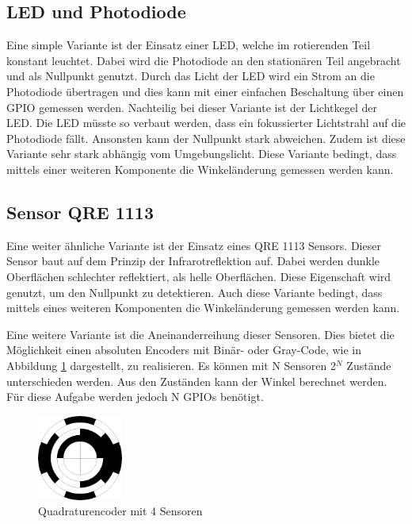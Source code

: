 \subsection{LED und Photodiode}
\label{sec:LED}
Eine simple Variante ist der Einsatz einer LED, welche im rotierenden Teil konstant leuchtet. Dabei wird die Photodiode an den stationären Teil angebracht und als Nullpunkt genutzt. Durch das Licht der LED wird ein Strom an die Photodiode übertragen und dies kann mit einer einfachen Beschaltung über einen GPIO gemessen werden. Nachteilig bei dieser Variante ist der Lichtkegel der LED. Die LED müsste so verbaut werden, dass ein fokussierter Lichtstrahl auf die Photodiode fällt. Ansonsten kann der  Nullpunkt stark abweichen. Zudem ist diese Variante sehr stark abhängig vom Umgebungslicht. Diese Variante bedingt, dass mittels einer weiteren Komponente die Winkeländerung gemessen werden kann.

\subsection{Sensor QRE 1113}
\label{sec:QRE}
Eine weiter ähnliche Variante ist der Einsatz eines QRE 1113 Sensors. Dieser Sensor baut auf dem Prinzip der Infrarotreflektion auf. Dabei werden dunkle Oberflächen schlechter reflektiert, als helle Oberflächen. Diese Eigenschaft wird genutzt, um den Nullpunkt zu detektieren. Auch diese Variante bedingt, dass mittels eines weiteren Komponenten die Winkeländerung gemessen werden kann.

Eine weitere Variante ist die Aneinanderreihung dieser Sensoren. Dies bietet die Möglichkeit einen absoluten Encoders mit Binär- oder Gray-Code, wie in Abbildung \ref{fig:Encoder} dargestellt, zu realisieren. Es können mit N Sensoren 2$^N$ Zustände unterschieden werden. Aus den Zuständen kann der Winkel berechnet werden. Für diese Aufgabe werden jedoch N GPIOs benötigt.
\begin{figure}[H]
	\centering
	\includegraphics[width=0.25\textwidth]{resources/encoder.png}
	\caption[Quadraturencoder mit 4 Sensoren]{Quadraturencoder mit 4 Sensoren}
	\label{fig:Encoder}
\end{figure} 

